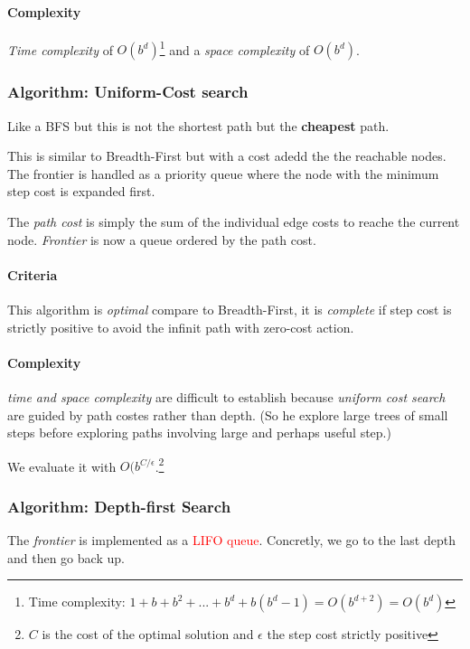 \paragraph{Complexity} \textit{Time complexity} of $O(b^d)$\footnote{Time complexity: $1+b+b^2+...+b^d+b(b^d-1) = O(b^{d+2}) = O(b^d)$} and a \textit{space complexity} of $O(b^d)$. 

\subsubsection{Algorithm: Uniform-Cost search}

Like a BFS but this is not the shortest path but the \textbf{cheapest} path.

This is similar to Breadth-First but with a cost adedd the the reachable
nodes. The frontier is handled as a priority queue where the node with the minimum step cost is expanded first.

The \textit{path  cost} is simply the sum of  the individual edge
costs  to reache  the current  node.  \textit{Frontier} is  now a  queue
ordered by the path cost.

\paragraph{Criteria}
This algorithm is \textit{optimal} compare to Breadth-First, it is \textit{complete} if step cost is strictly positive to avoid the infinit path with zero-cost action.

\paragraph{Complexity}

\textit{time and  space complexity}  are difficult to  establish because
\textit{uniform cost search} are guided by path costes rather than depth.
(So he explore large trees of  small steps before
exploring paths involving large and perhaps useful step.)

We evaluate it with $O(b^{C/\epsilon}$.\footnote{$C$ is the cost of the optimal solution and $\epsilon$ the step cost strictly positive}

\subsubsection{Algorithm: Depth-first Search}

The \textit{frontier}  is implemented as a  \textcolor{red}{LIFO queue}.
Concretly, we go to the last depth and then go back up.

